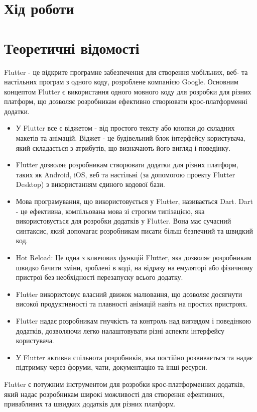 \documentclass[oneside,14pt]{extarticle}
\begin{document}
\begin{normalsize}
	\section*{Хід роботи}
	\section*{Теоретичні відомості}
	Flutter - це відкрите програмне забезпечення для створення мобільних, веб- та настільних програм з одного коду, розроблене компанією Google. Основним концептом Flutter є використання одного мовного коду для розробки для різних платформ, що дозволяє розробникам ефективно створювати крос-платформенні додатки.
	
	\begin{itemize}
		\item У Flutter все є віджетом - від простого тексту або кнопки до складних макетів та анімацій. Віджет - це будівельний блок інтерфейсу користувача, який складається з атрибутів, що визначають його вигляд і поведінку.
		\item Flutter дозволяє розробникам створювати додатки для різних платформ, таких як Android, iOS, веб та настільні (за допомогою проекту Flutter Desktop) з використанням єдиного кодової бази.
		\item Мова програмування, що використовується у Flutter, називається Dart. Dart - це ефективна, компільована мова зі строгим типізацією, яка використовується для розробки додатків у Flutter. Вона має сучасний синтаксис, який допомагає розробникам писати більш безпечний та швидкий код.
		\item Hot Reload: Це одна з ключових функцій Flutter, яка дозволяє розробникам швидко бачити зміни, зроблені в коді, на відразу на емуляторі або фізичному пристрої без необхідності перезапуску всього додатку.
		\item Flutter використовує власний движок малювання, що дозволяє досягнути високої продуктивності та плавності анімацій навіть на простих пристроях.
		\item Flutter надає розробникам гнучкість та контроль над виглядом і поведінкою додатків, дозволяючи легко налаштовувати різні аспекти інтерфейсу користувача.
		\item У Flutter активна спільнота розробників, яка постійно розвивається та надає підтримку через форуми, чати, документацію та інші ресурси.
	\end{itemize}
	Flutter є потужним інструментом для розробки крос-платформенних додатків, який надає розробникам широкі можливості для створення ефективних, привабливих та швидких додатків для різних платформ.
	

\end{normalsize}
\end{document}
